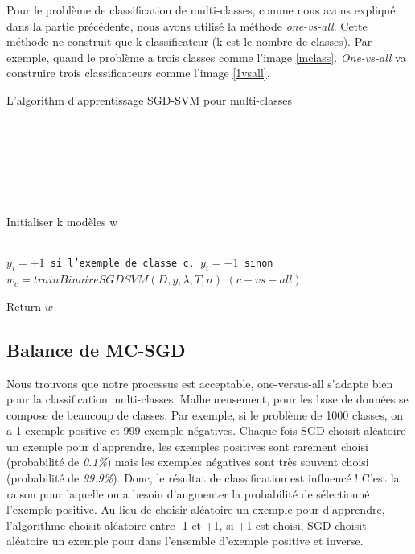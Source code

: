 Pour le problème de classification de multi-classes, comme nous avons expliqué dans la partie précédente, nous avons utilisé la méthode \textit{one-vs-all}. Cette méthode ne construit que k classificateur (k est le nombre de classes). Par exemple, quand le problème a trois classes comme l'image \ref{mclass}. \textit{One-vs-all} va construire trois classificateurs comme l'image \ref{1vsall}.



\makeatletter
\def\BState{\State\hskip-\ALG@thistlm}
\makeatother


\begin{algorithm}[H]
\caption{L'algorithm d'apprentissage SGD-SVM pour multi-classes}\label{mcsgdal}
\begin{algorithmic}[1]

\\
\\
\\
\\
\\
\\

\State Initialiser k modèles w

\\
\State \texttt{$y_i = +1$ si l'exemple de classe c, $y_i = -1$ sinon}
\State \texttt{$w_c = trainBinaireSGDSVM(D, y, \lambda, T, n)$} $(c-vs-all)$
\EndFor

\State Return $w$

\EndProcedure
\end{algorithmic}
\end{algorithm}


\subsection{Balance de MC-SGD}
Nous trouvons que notre processus est acceptable, one-versus-all s'adapte bien pour la classification multi-classes. Malheureusement, pour les base de données se compose de beaucoup de classes. Par exemple, si le problème de 1000 classes, on a 1 exemple positive et 999 exemple négatives. Chaque fois SGD choisit aléatoire un exemple pour d'apprendre, les exemples positives sont rarement choisi (probabilité de \emph{0.1\%}) mais les exemples négatives sont très souvent choisi (probabilité de \emph{99.9\%}). Donc, le résultat de classification est influencé ! C'est la raison pour laquelle on a besoin d'augmenter la probabilité de sélectionné l'exemple positive. Au lieu de choisir aléatoire un exemple pour d'apprendre, l'algorithme choisit aléatoire entre -1 et +1, si +1 est choisi, SGD choisit aléatoire un exemple pour dans l'ensemble d'exemple positive et inverse.

